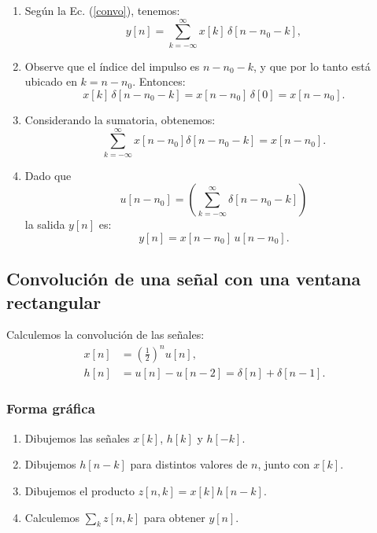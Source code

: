 \begin{enumerate}
	\item Según la Ec. (\ref{convo}), tenemos:
	\begin{equation}
		y[n] = \sum_{k=-\infty}^{\infty} x[k] \, \delta[n-n_{0}-k],
	\end{equation}
	
	\item Observe que el índice del impulso es $n - n_{0} - k$, y que por lo tanto está ubicado en $k = n - n_{0}$. Entonces:
	\begin{equation}
		x[k] \, \delta[n-n_{0}-k] = x[n-n_{0}] \, \delta[0] = x[n-n_{0}].
	\end{equation}
	
	\item Considerando la sumatoria, obtenemos:
	\begin{equation}
		\sum_{k=-\infty}^{\infty} x[n-n_{0}] \delta[n-n_{0}-k] = x[n-n_{0}].
	\end{equation}
	
	\item Dado que
	\begin{equation}
		u[n-n_{0}] = \left( \sum_{k=-\infty}^{\infty} \delta[n-n_{0}-k] \right)
	\end{equation}
	la salida $y[n]$ es:
	\begin{equation}
		y[n] = x[n-n_{0}] \, u[n-n_{0}].
	\end{equation}
\end{enumerate}

\subsection{Convolución de una señal con una ventana rectangular}

Calculemos la convolución de las señales:
\begin{align}
	x[n] &= \left( \frac{1}{2}\right)^n u[n], \\
	h[n] &= u[n] - u[n-2] = \delta[n] + \delta[n-1].
\end{align}

\subsubsection{Forma gráfica}

\begin{enumerate}
	\item Dibujemos las señales $x[k]$, $h[k]$ y $h[-k]$.
	\item Dibujemos $h[n-k]$ para distintos valores de $n$, junto con $x[k]$.
	\item Dibujemos el producto $z[n,k] = x[k] h[n-k]$.
	\item Calculemos $\sum_{k}z[n,k]$ para obtener $y[n]$.
\end{enumerate}

